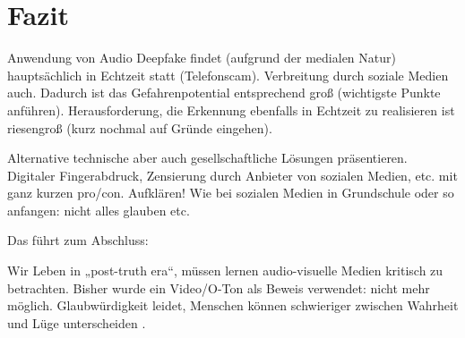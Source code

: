 \section{Fazit}
Anwendung von Audio Deepfake findet (aufgrund der medialen Natur) hauptsächlich in Echtzeit statt (Telefonscam).
Verbreitung durch soziale Medien auch.
Dadurch ist das Gefahrenpotential entsprechend groß (wichtigste Punkte anführen).
Herausforderung, die Erkennung ebenfalls in Echtzeit zu realisieren ist riesengroß (kurz nochmal auf Gründe eingehen).

Alternative technische aber auch gesellschaftliche Lösungen präsentieren.
Digitaler Fingerabdruck, Zensierung durch Anbieter von sozialen Medien, etc. mit ganz kurzen pro/con.
Aufklären! Wie bei sozialen Medien in Grundschule oder so anfangen: nicht alles glauben etc.

Das führt zum Abschluss:

Wir Leben in „post-truth era“, müssen lernen audio-visuelle Medien kritisch zu betrachten.
Bisher wurde ein Video/O-Ton als Beweis verwendet: nicht mehr möglich.
Glaubwürdigkeit leidet, Menschen können schwieriger zwischen Wahrheit und Lüge unterscheiden \citep[][]{Godulla2021}.